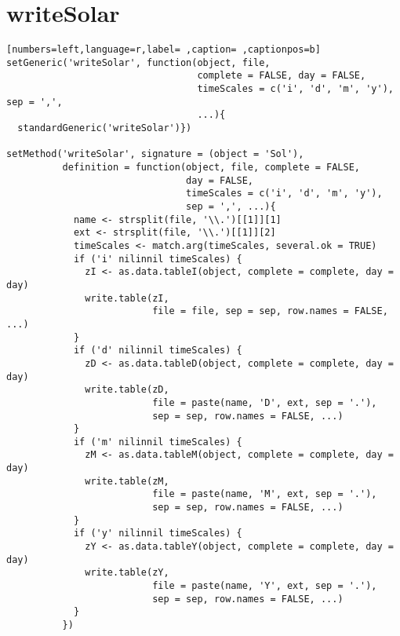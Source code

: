 \section{writeSolar}
\label{sec:org41ef5ab}
\begin{lstlisting}[numbers=left,language=r,label= ,caption= ,captionpos=b]
setGeneric('writeSolar', function(object, file,
                                  complete = FALSE, day = FALSE,
                                  timeScales = c('i', 'd', 'm', 'y'), sep = ',',
                                  ...){
  standardGeneric('writeSolar')})

setMethod('writeSolar', signature = (object = 'Sol'),
          definition = function(object, file, complete = FALSE,
                                day = FALSE,
                                timeScales = c('i', 'd', 'm', 'y'),
                                sep = ',', ...){
            name <- strsplit(file, '\\.')[[1]][1]
            ext <- strsplit(file, '\\.')[[1]][2]
            timeScales <- match.arg(timeScales, several.ok = TRUE)
            if ('i' nilinnil timeScales) {
              zI <- as.data.tableI(object, complete = complete, day = day)
              write.table(zI,
                          file = file, sep = sep, row.names = FALSE, ...)
            }
            if ('d' nilinnil timeScales) {
              zD <- as.data.tableD(object, complete = complete, day = day)
              write.table(zD,
                          file = paste(name, 'D', ext, sep = '.'),
                          sep = sep, row.names = FALSE, ...)
            }
            if ('m' nilinnil timeScales) {
              zM <- as.data.tableM(object, complete = complete, day = day)
              write.table(zM,
                          file = paste(name, 'M', ext, sep = '.'),
                          sep = sep, row.names = FALSE, ...)
            }
            if ('y' nilinnil timeScales) {
              zY <- as.data.tableY(object, complete = complete, day = day)
              write.table(zY,
                          file = paste(name, 'Y', ext, sep = '.'),
                          sep = sep, row.names = FALSE, ...)
            }
          })
\end{lstlisting}
